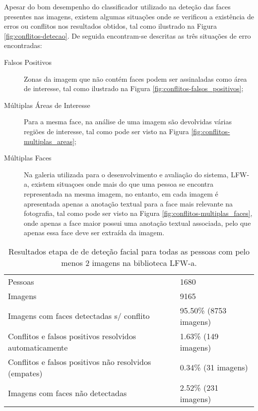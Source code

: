 Apesar do bom desempenho do classificador utilizado na deteção das faces presentes nas imagens, existem algumas situações onde se verificou a existência de erros ou conflitos nos resultados obtidos, tal como ilustrado na Figura  \ref{fig:conflitos-detecao}. De seguida encontram-se descritas as três situações de erro encontradas:
\begin{description}
\item[Falsos Positivos] Zonas da imagem que não contém faces podem ser assinaladas como área de interesse, tal como ilustrado na Figura \ref{fig:conflitos-falsos_positivos};
\item[Múltiplas Áreas de Interesse] Para a mesma face, na análise de uma imagem são devolvidas várias regiões de interesse, tal como pode ser visto na Figura \ref{fig:conflitos-multiplas_areas};
\item[Múltiplas Faces] Na galeria utilizada para o desenvolvimento e avaliação do sistema, LFW-a, existem situaçoes onde mais do que uma pessoa se encontra representada na mesma imagem, no entanto, em cada imagem é apresentada apenas a anotação textual para a face mais relevante na fotografia, tal como pode ser visto na Figura \ref{fig:conflitos-multiplas_faces}, onde apenas a face maior possui uma anotação textual associada, pelo que apenas essa face deve ser extraída da imagem.
\end{description}

\begin{center}
\begin{table}
\begin{center}
\caption{Resultados etapa de de deteção facial para todas as pessoas com pelo menos 2 imagens na biblioteca LFW-a.}
    \begin{tabular}{ll}
    \hline
    \hline
    Pessoas                                                 & 1680                   \\
    Imagens                                                 & 9165                   \\ \hline
    Imagens com faces detectadas s/ conflito                & 95.50\% (8753 imagens) \\
    Conflitos e falsos positivos resolvidos automaticamente & 1.63\% (149 imagens)   \\
    Conflitos e falsos positivos não resolvidos (empates)   & 0.34\% (31 imagens)    \\
    Imagens com faces não detectadas                        & 2.52\% (231 imagens)   \\
    \hline
    \hline
    \end{tabular}
    \label{tab:desempenho_detecao}
\end{center}
\end{table}
\end{center}

